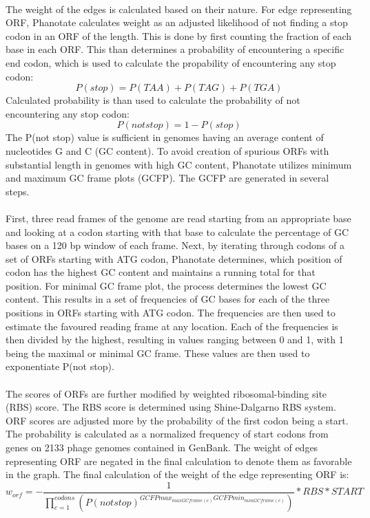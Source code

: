 \paragraph*{}
The weight of the edges is calculated based on their nature. For edge representing ORF, Phanotate calculates weight as an adjusted likelihood of not finding a stop codon in an ORF of the length. This is done by first counting the fraction of each base in each ORF. This than determines a probability of encountering a specific end codon, which is used to calculate the propability of encountering any stop codon:
\[ P(stop) = P(TAA) + P(TAG) + P(TGA) \]
Calculated probability is than used to calculate the probability of not encountering any stop codon:
\[ P(not stop) = 1 - P(stop) \]
The P(not stop) value is sufficient in genomes having an average content of nucleotides G and C (GC content). To avoid creation of spurious ORFs with substantial length in genomes with high GC content, Phanotate utilizes minimum and maximum GC frame plots (GCFP). The GCFP are generated in several steps. 
\paragraph*{}
First, three read frames of the genome are read starting from an appropriate base and looking at a codon starting with that base to calculate the percentage of GC bases on a 120 bp window of each frame. Next, by iterating through codons of a set of ORFs starting with ATG codon, Phanotate determines, which position of codon has the highest GC content and maintains a running total for that position. For minimal GC frame plot, the process determines the lowest GC content. This results in a set of frequencies of GC bases for each of the three positions in ORFs starting with ATG codon. The frequencies are then used to estimate the favoured reading frame at any location. Each of the frequencies is then divided by the highest, resulting in values ranging between 0 and 1, with 1 being the maximal or minimal GC frame. These values are then used to exponentiate P(not stop).
\paragraph*{}
The scores of ORFs are further modified by weighted ribosomal-binding site (RBS) score. The RBS score is determined using Shine-Dalgarno RBS system. ORF scores are adjusted more by the probability of the first codon being a start. The probability is calculated as a normalized frequency of start codons from genes on 2133 phage genomes contained in GenBank. The weight of edges  representing ORF are negated in the final calculation to denote them as favorable in the graph. The final calculation of the weight of the edge representing ORF is:
\[ w_{orf} = - \frac{1}{\prod\limits_{c=1}^{codons}(P(not stop)^{GCFPmax_{maxGCframe(c)} GCFPmin_{minGCframe(c)}})} * RBS * START \]
